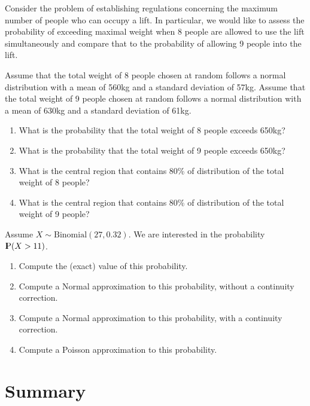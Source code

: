 \documentclass[]{krantz}
\newcommand{\Prob}{{\rm I\kern-.3em P}}
\theoremstyle{definition}
\theoremstyle{definition}
\theoremstyle{definition}
\theoremstyle{remark}
\let\BeginKnitrBlock\begin \let\EndKnitrBlock\end
\begin{document}
\BeginKnitrBlock{exercise}
\protect\hypertarget{exr:unnamed-chunk-88}{}{\label{exr:unnamed-chunk-88}
}Consider the problem of establishing regulations concerning the maximum
number of people who can occupy a lift. In particular, we would like to
assess the probability of exceeding maximal weight when 8 people are
allowed to use the lift simultaneously and compare that to the
probability of allowing 9 people into the lift.

Assume that the total weight of 8 people chosen at random follows a
normal distribution with a mean of 560kg and a standard deviation of
57kg. Assume that the total weight of 9 people chosen at random follows
a normal distribution with a mean of 630kg and a standard deviation of
61kg.

\begin{enumerate}
\def\labelenumi{\arabic{enumi}.}
\item
  What is the probability that the total weight of 8 people exceeds
  650kg?
\item
  What is the probability that the total weight of 9 people exceeds
  650kg?
\item
  What is the central region that contains 80\% of distribution of the
  total weight of 8 people?
\item
  What is the central region that contains 80\% of distribution of the
  total weight of 9 people?
\end{enumerate}
\EndKnitrBlock{exercise}

\BeginKnitrBlock{exercise}
\protect\hypertarget{exr:unnamed-chunk-89}{}{\label{exr:unnamed-chunk-89}
}Assume \(X \sim \mbox{Binomial}(27,0.32)\). We are interested in the
probability \(\Prob(X > 11)\).

\begin{enumerate}
\def\labelenumi{\arabic{enumi}.}
\item
  Compute the (exact) value of this probability.
\item
  Compute a Normal approximation to this probability, without a
  continuity correction.
\item
  Compute a Normal approximation to this probability, with a continuity
  correction.
\item
  Compute a Poisson approximation to this probability.
\end{enumerate}
\EndKnitrBlock{exercise}

\section{Summary}\label{summary-5}
\end{document}
